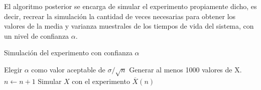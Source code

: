   \pagebreak
  \par El algoritmo posterior se encarga de simular el experimento propiamente dicho, es decir, recrear la simulación
  la cantidad de veces necesarias para obtener los valores de la media y varianza muestrales de los tiempos de vida del
  sistema, con un nivel de confianza $\alpha$.

  \begin{algorithm}
  \caption{Simulación del experimento con confianza $\alpha$}
    \label{alg2}
    \begin{algorithmic}
      \STATE Elegir $\alpha$ como valor aceptable de $\sigma / \sqrt{n}$
      \STATE Generar al menos 1000 valores de X.
        \STATE $n \leftarrow n + 1$
        \STATE Simular $X$ con el experimento
      \ENDWHILE
      \RETURN $\overline{X}(n)$
    \end{algorithmic}
  \end{algorithm}
